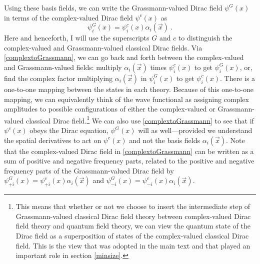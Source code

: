 \documentclass[onecolumn,secnumarabic,amsmath,amssymb,balancelastpage,nofootinbib]{article}
\begin{document}
Using these basis fields, we can write the Grassmann-valued Dirac field $\psi^G(x)$ in terms of the complex-valued Dirac field $\psi^c(x)$ as
\begin{equation}
\psi^G_i(x)=\psi^c_i(x) \alpha_i(\vec{x})
\ .
\label{complextoGrassmann}
\end{equation}
Here and henceforth, I will use the superscripts $G$ and $c$ to distinguish the complex-valued and Grassmann-valued classical Dirac fields.  Via \eqref{complextoGrassmann}, we can go back and forth between the complex-valued and Grassmann-valued fields: multiply $\alpha_i(\vec{x})$ times $\psi_i^c(x)$ to get $\psi^G_i(x)$, or, find the complex factor multiplying $\alpha_i(\vec{x})$ in $\psi^G_i(x)$ to get $\psi_i^c(x)$.  There is a one-to-one mapping between the states in each theory.  Because of this one-to-one mapping, we can equivalently think of the wave functional as assigning complex amplitudes to possible configurations of either the complex-valued or Grassmann-valued classical Dirac field.\footnote{This means that whether or not we choose to insert the intermediate step of Grassmann-valued classical Dirac field theory between complex-valued Dirac field theory and quantum field theory, we can view the quantum state of the Dirac field as a superposition of states of the complex-valued classical Dirac field.  This is the view that was adopted in the main text and that played an important role in section \ref{minsize}.}  We can also use \eqref{complextoGrassmann} to see that if $\psi^c(x)$ obeys the Dirac equation, $\psi^G(x)$ will as well---provided we understand the spatial derivatives to act on $\psi^c(x)$ and not the basis fields $\alpha_i(\vec{x})$.  Note that the complex-valued Dirac field in \eqref{complextoGrassmann} can be written as a sum of positive and negative frequency parts, related to the positive and negative frequency parts of the Grassmann-valued Dirac field by $\psi^G_{+i}(x)=\psi_{+i}^c(x) \alpha_i(\vec{x})$ and $\psi^G_{-i}(x)=\psi_{-i}^c(x) \alpha_i(\vec{x})$.
\end{document}
